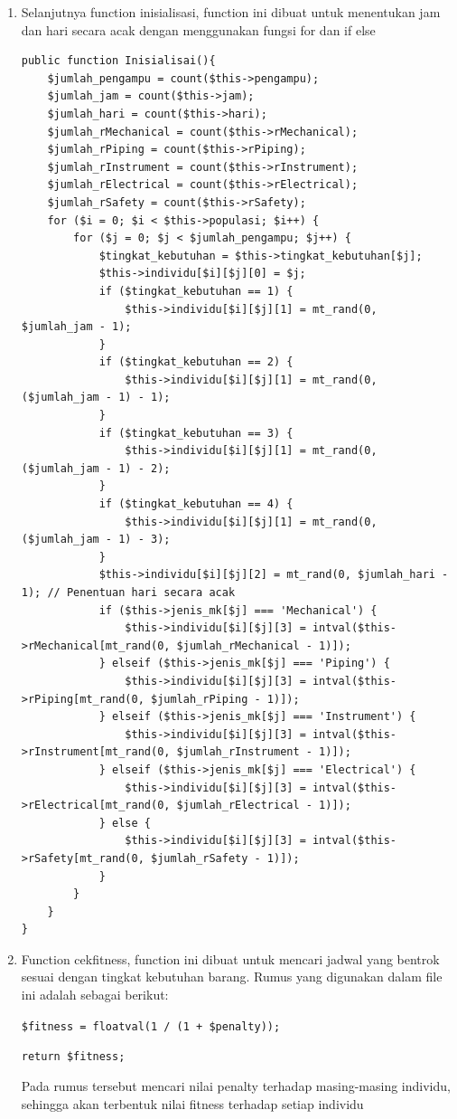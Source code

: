 \begin{enumerate}
	\item Selanjutnya function inisialisasi, function ini dibuat untuk menentukan jam dan hari secara acak dengan menggunakan fungsi for dan if else
\begin{lstlisting}
public function Inisialisai(){
    $jumlah_pengampu = count($this->pengampu);        
    $jumlah_jam = count($this->jam);
    $jumlah_hari = count($this->hari);
    $jumlah_rMechanical = count($this->rMechanical);
    $jumlah_rPiping = count($this->rPiping);
    $jumlah_rInstrument = count($this->rInstrument);
    $jumlah_rElectrical = count($this->rElectrical);
    $jumlah_rSafety = count($this->rSafety);
    for ($i = 0; $i < $this->populasi; $i++) {
        for ($j = 0; $j < $jumlah_pengampu; $j++) {
            $tingkat_kebutuhan = $this->tingkat_kebutuhan[$j];
            $this->individu[$i][$j][0] = $j;
            if ($tingkat_kebutuhan == 1) {
                $this->individu[$i][$j][1] = mt_rand(0,  $jumlah_jam - 1);
            }
            if ($tingkat_kebutuhan == 2) {
                $this->individu[$i][$j][1] = mt_rand(0, ($jumlah_jam - 1) - 1);
            }
            if ($tingkat_kebutuhan == 3) {
                $this->individu[$i][$j][1] = mt_rand(0, ($jumlah_jam - 1) - 2);
            }
            if ($tingkat_kebutuhan == 4) {
                $this->individu[$i][$j][1] = mt_rand(0, ($jumlah_jam - 1) - 3);
            }
            $this->individu[$i][$j][2] = mt_rand(0, $jumlah_hari - 1); // Penentuan hari secara acak 
            if ($this->jenis_mk[$j] === 'Mechanical') {
                $this->individu[$i][$j][3] = intval($this->rMechanical[mt_rand(0, $jumlah_rMechanical - 1)]);
            } elseif ($this->jenis_mk[$j] === 'Piping') {
                $this->individu[$i][$j][3] = intval($this->rPiping[mt_rand(0, $jumlah_rPiping - 1)]);
            } elseif ($this->jenis_mk[$j] === 'Instrument') {
                $this->individu[$i][$j][3] = intval($this->rInstrument[mt_rand(0, $jumlah_rInstrument - 1)]);
            } elseif ($this->jenis_mk[$j] === 'Electrical') {
                $this->individu[$i][$j][3] = intval($this->rElectrical[mt_rand(0, $jumlah_rElectrical - 1)]);
            } else {
                $this->individu[$i][$j][3] = intval($this->rSafety[mt_rand(0, $jumlah_rSafety - 1)]);                    
            }
        }
    }
}
\end{lstlisting}
	
	\item Function cekfitness, function ini dibuat untuk mencari jadwal yang bentrok sesuai dengan tingkat kebutuhan barang. Rumus yang digunakan dalam file ini adalah sebagai berikut:
	\par \verb|$fitness = floatval(1 / (1 + $penalty));|
	\par \verb|return $fitness;|
	\par Pada rumus tersebut mencari nilai penalty terhadap masing-masing individu, sehingga akan terbentuk nilai fitness terhadap setiap individu
	

\end{enumerate}
